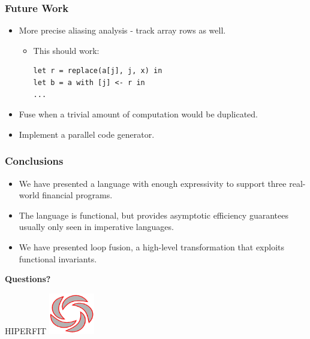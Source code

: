 \documentclass[rgb,dvipsnames]{beamer}
\begin{document}
\begin{frame}[fragile]
  \frametitle{Future Work}

  \begin{itemize}
  \item More precise aliasing analysis - track array rows as well.
    \begin{itemize}
    \item This should work:
\begin{lstlisting}
let r = replace(a[j], j, x) in
let b = a with [j] <- r in
...
\end{lstlisting}
    \end{itemize}

  \item Fuse when a trivial amount of computation would be duplicated.
  \item Implement a parallel code generator.
  \end{itemize}
\end{frame}

\begin{frame}
  \frametitle{Conclusions}

  \begin{itemize}
  \item We have presented a language with enough expressivity to
    support three real-world financial programs.
  \item The language is functional, but provides asymptotic efficiency
    guarantees usually only seen in imperative languages.
  \item We have presented loop fusion, a high-level transformation
    that exploits functional invariants.
  \end{itemize}

\textbf{Questions?}

\vspace{2.5cm}
  \hfill\Huge HIPERFIT \includegraphics[width=2cm]{img/hiperfitlogo.png}
\end{frame}
\end{document}
